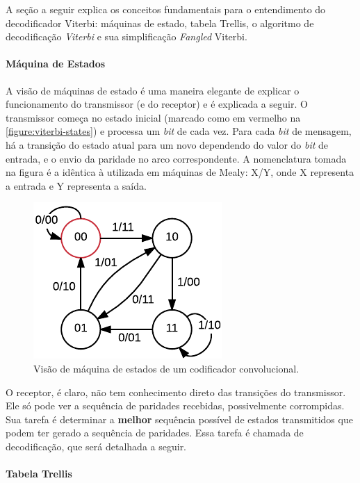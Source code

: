 	A seção a seguir explica os conceitos fundamentais para o entendimento do decodificador Viterbi: máquinas de estado, tabela Trellis, o algoritmo de decodificação \textit{Viterbi} e sua simplificação \textit{Fangled} Viterbi.

	\paragraph*{Máquina de Estados}

	A visão de máquinas de estado é uma maneira elegante de explicar o funcionamento do transmissor (e do receptor) e é explicada a seguir. O transmissor começa no estado inicial (marcado como em vermelho na \autoref{figure:viterbi-states}) e processa um \textit{bit} de cada vez. Para cada \textit{bit} de mensagem, há a transição do estado atual para um novo dependendo do valor do \textit{bit} de entrada, e o envio da paridade no arco correspondente. A nomenclatura tomada na figura é a idêntica à utilizada em máquinas de Mealy: X/Y, onde X representa a entrada e Y representa a saída.
	\begin{figure}[htb]
		\caption{\label{figure:viterbi-states}Visão de máquina de estados de um codificador convolucional.}
		\centering
		\includegraphics[width=0.25\textheight]{viterbi/states.pdf}
	\end{figure}
	O receptor, é claro, não tem conhecimento direto das transições do transmissor. Ele só pode ver a sequência de paridades recebidas, possivelmente corrompidas. Sua tarefa é determinar a \textbf{melhor} sequência possível de estados transmitidos que podem ter gerado a sequência de paridades. Essa tarefa é chamada de decodificação, que será detalhada a seguir.

	\paragraph*{Tabela Trellis}

